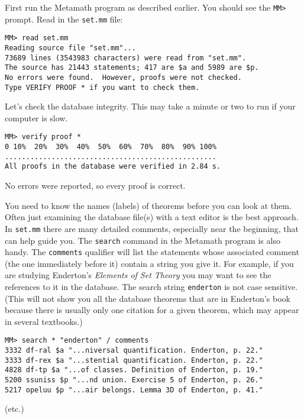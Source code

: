 First run the Metamath program as described earlier.  You should see the
\verb/MM>/ prompt.  Read in the \texttt{set.mm} file:

\begin{verbatim}
MM> read set.mm
Reading source file "set.mm"...
73689 lines (3543983 characters) were read from "set.mm".
The source has 21443 statements; 417 are $a and 5989 are $p.
No errors were found.  However, proofs were not checked.
Type VERIFY PROOF * if you want to check them.
\end{verbatim}

Let's check the database integrity.  This may take a minute or two to run if
your computer is slow.

\begin{verbatim}
MM> verify proof *
0 10%  20%  30%  40%  50%  60%  70%  80%  90% 100%
..................................................
All proofs in the database were verified in 2.84 s.
\end{verbatim}

No errors were reported, so every proof is correct.

You need to know the names (labels) of theorems before you can look at them.
Often just examining the database file(s) with a text editor is the best
approach.  In \texttt{set.mm} there are many detailed comments, especially near
the beginning, that can help guide you. The \texttt{search} command in the
Metamath program is also handy.  The \texttt{comments} qualifier will list the
statements whose associated comment (the one immediately before it) contain a
string you give it.  For example, if you are studying Enderton's {\em Elements
of Set Theory} \cite{Enderton} you may want to see
the references to it in the database.  The search string \texttt{enderton} is not
case sensitive.  (This will not show you all the database theorems that are in
Enderton's book because there is usually only one citation for a given
theorem, which may appear in several textbooks.)

\begin{verbatim}
MM> search * "enderton" / comments
3332 df-ral $a "...niversal quantification. Enderton, p. 22."
3333 df-rex $a "...stential quantification. Enderton, p. 22."
4828 df-tp $a "...of classes. Definition of Enderton, p. 19."
5200 ssuniss $p "...nd union. Exercise 5 of Enderton, p. 26."
5217 opeluu $p "...air belongs. Lemma 3D of Enderton, p. 41."
\end{verbatim}
\begin{center}
(etc.)
\end{center}

